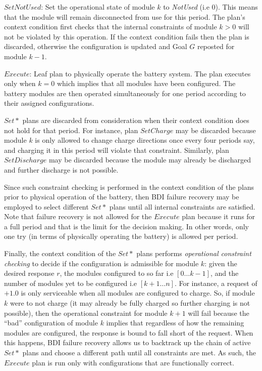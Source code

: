 $SetNotUsed$: Set the operational state of module $k$ to {\em NotUsed} (i.e $0$). This means that the module will remain disconnected from use for this period. The plan's context condition first checks that the internal constraints of module $k>0$ will not be violated by this operation. If the context condition fails then the plan is discarded, otherwise the configuration is updated and Goal $G$ reposted for module $k-1$.

$Execute$: Leaf plan to physically operate the battery system. The plan executes only when $k=0$ which implies that all modules have been configured. The battery modules are then operated simultaneously for one period according to their assigned configurations. 

$Set*$ plans are discarded from consideration when their context condition does not hold for that period. For instance, plan $SetCharge$ may be discarded because module $k$ is only allowed to change charge directions once every four periods say, and charging it in this period will violate that constraint. Similarly, plan $SetDischarge$ may be discarded because the module may already be discharged and further discharge is not possible. 

Since such constraint checking is performed in the context condition of the plans prior to physical operation of the battery, then BDI failure recovery may be employed to select different $Set*$ plans until all internal constraints are satisfied. Note that failure recovery is not allowed for the $Execute$ plan because it runs for a full period and that is the limit for the decision making. In other words, only one try (in terms of physically operating the battery) is allowed per period.

Finally, the context condition of the $Set*$ plans performs {\em operational constraint checking} to decide if the configuration is admissible for module $k$: given the desired response $r$, the modules configured to so far i.e $[0 \ldots k-1]$, and the number of modules yet to be configured i.e $[k+1 \ldots n]$. For instance, a request of $+1.0$ is only serviceable when all modules are configured to charge. So, if module $k$ were to not charge (it may already be fully charged so further charging is not possible), then the operational constraint for module $k+1$ will fail because the ``bad'' configuration of module $k$ implies that regardless of how the remaining modules are configured, the response is bound to fall short of the request. When this happens, BDI failure recovery allows us to backtrack up the chain of active $Set*$ plans and choose a different path until all constraints are met. As such, the $Execute$ plan is run only with configurations that are functionally correct.



